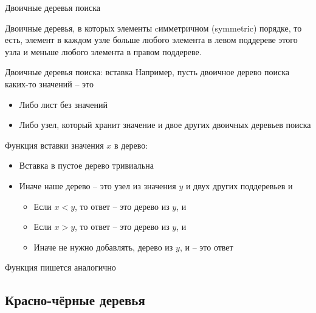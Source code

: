 \begin{frame}{Двоичные деревья поиска}
\begin{definition}
Двоичные деревья, в которых элементы cимметричном
 (symmetric) порядке, то есть, элемент в каждом узле больше любого элемента в левом поддереве
этого узла и меньше любого элемента в правом поддереве.
\end{definition}
\end{frame}

\begin{frame}{Двоичные деревья поиска: вставка}
Например, пусть двоичное дерево поиска каких-то значений -- это
\begin{itemize}
\item Либо лист без значений
\item Либо узел, который хранит значение и двое других двоичных деревьев поиска
\end{itemize}
\vspace{1em}

Функция  вставки значения $x$ в дерево:
\begin{itemize}
\item Вставка в пустое дерево тривиальна
\item Иначе наше дерево -- это узел из значения $y$ и двух других поддеревьев  и 
\begin{itemize}
\item Если $x<y$, то ответ -- это дерево из $y$,  и 
\item Если $x>y$, то ответ -- это дерево из $y$,  и 
\item Иначе не нужно добавлять, дерево из $y$,  и  -- это ответ
\end{itemize}
\end{itemize}
\vspace{2em}
Функция  пишется аналогично
\end{frame}

%






\subsection{Красно-чёрные деревья}

